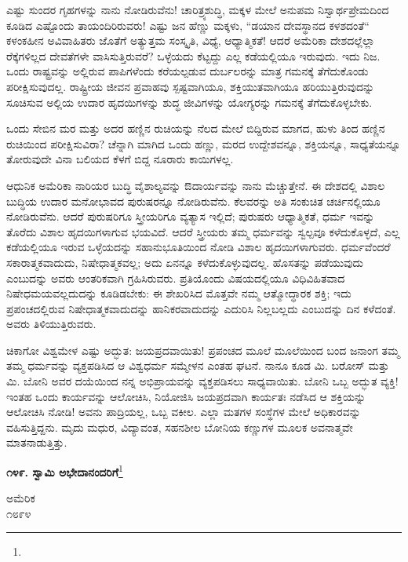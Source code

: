 ಎಷ್ಟು ಸುಂದರ ಗೃಹಗಳನ್ನು ನಾನು ನೋಡಿರುವೆನು! ಚಾರಿತ್ರ್ಯಶುದ್ಧಿ, ಮಕ್ಕಳ ಮೇಲೆ ಅನುಪಮ ನಿಸ್ವಾರ್ಥಪ್ರೇಮದಿಂದ ಕೂಡಿದ ಎಷ್ಟೊಂದು ತಾಯಂದಿರಿರುವರು! ಎಷ್ಟು ಜನ ಹೆಣ್ಣು ಮಕ್ಕಳು, “ಡಯಾನ ದೇವಸ್ಥಾನದ ಕಳಶದಂತೆ“ ಕಳಂಕಹೀನ ಅವಿವಾಹಿತರು\enginline{-} ಜೊತೆಗೆ ಅತ್ಯುತ್ತಮ ಸಂಸ್ಕೃತಿ, ವಿಧ್ಯೆ, ಆಧ್ಯಾತ್ಮಿಕತೆ! ಆದರೆ ಅಮೆರಿಕಾ ದೇಶದಲ್ಲೆಲ್ಲಾ ರೆಕ್ಕೆಗಳಿಲ್ಲದ ದೇವತೆಗಳೇ ವಾಸಿಸುತ್ತಿರುವರೆ? ಒಳ್ಳೆಯದು ಕೆಟ್ಟದ್ದು ಎಲ್ಲ ಕಡೆಯಲ್ಲಿಯೂ ಇರುವುದು. ಇದು ನಿಜ. ಒಂದು ರಾಷ್ಟ್ರವನ್ನು ಅಲ್ಲಿರುವ ಪಾಪಿಗಳೆಂದು ಕರೆಯಲ್ಪಡುವ ದುರ್ಬಲರನ್ನು ಮಾತ್ರ ಗಮನಕ್ಕೆ ತೆಗೆದುಕೊಂಡು ಪರೀಕ್ಷಿಸುವುದಲ್ಲ. ರಾಷ್ಟ್ರೀಯ ಜೀವನ ಪ್ರವಾಹವು ಸ್ಪಷ್ಟವಾಗಿಯೂ, ಶಕ್ತಿಯುತವಾಗಿಯೂ ಹರಿಯುತ್ತಿರುವುದನ್ನು ಸೂಚಿಸುವ ಅಲ್ಲಿಯ ಉದಾರ ಹೃದಯಿಗಳನ್ನು ಶುದ್ಧ ಜೀವಿಗಳನ್ನು ಯೋಗ್ಯರನ್ನು ಗಮನಕ್ಕೆ ತೆಗೆದುಕೊಳ್ಳಬೇಕು.

ಒಂದು ಸೇಬಿನ ಮರ ಮತ್ತು ಅದರ ಹಣ್ಣಿನ ರುಚಿಯನ್ನು ನೆಲದ ಮೇಲೆ ಬಿದ್ದಿರುವ ಮಾಗದ, ಹುಳು ತಿಂದ ಹಣ್ಣಿನ ರುಚಿಯಿಂದ ಪರೀಕ್ಷಿಸುವಿರಾ? ಚೆನ್ನಾಗಿ ಮಾಗಿದ ಒಂದು ಹಣ್ಣು, ಮರದ ಉದ್ದೇಶವನ್ನೂ, ಶಕ್ತಿಯನ್ನೂ, ಸಾಧ್ಯತೆಯನ್ನೂ ತೋರುವುದೇ ವಿನಾ ಬಲಿಯದ ಕೆಳಗೆ ಬಿದ್ದ ನೂರಾರು ಕಾಯಿಗಳಲ್ಲ.

ಆಧುನಿಕ ಅಮೆರಿಕಾ ನಾರಿಯರ ಬುದ್ಧಿ ವೈಶಾಲ್ಯವನ್ನು ಔದಾರ್ಯವನ್ನು ನಾನು ಮೆಚ್ಚುತ್ತೇನೆ. ಈ ದೇಶದಲ್ಲಿ ವಿಶಾಲ ಬುದ್ಧಿಯ ಉದಾರ ಮನೋಭಾವದ ಪುರುಷರನ್ನೂ ನೋಡಿರುವೆನು. ಕೆಲವರನ್ನು ಅತಿ ಸಂಕುಚಿತ ಚರ್ಚಿನಲ್ಲಿಯೂ ನೋಡಿರುವೆನು. ಆದರೆ ಪುರುಷರಿಗೂ ಸ್ತ್ರೀಯರಿಗೂ ವ್ಯತ್ಯಾಸ ಇಲ್ಲಿದೆ; ಪುರುಷರು ಆಧ್ಯಾತ್ಮಿಕತೆ, ಧರ್ಮ ಇವನ್ನು ತೊರೆದು ವಿಶಾಲ ಹೃದಯಿಗಳಾಗುವ ಭಯವಿದೆ. ಆದರೆ ಸ್ತ್ರೀಯರು ತಮ್ಮ ಧರ್ಮವನ್ನು ಸ್ವಲ್ಪವೂ ಕಳೆದುಕೊಳ್ಳದೆ, ಎಲ್ಲ ಕಡೆಯಲ್ಲಿಯೂ ಇರುವ ಒಳ್ಳೆಯದನ್ನು ಸಹಾನುಭೂತಿಯಿಂದ ನೋಡಿ ವಿಶಾಲ ಹೃದಯಿಗಳಾಗುವರು. ಧರ್ಮವೆಂದರೆ ಸಕಾರಾತ್ಮಕವಾದುದು, ನಿಷೇಧಾತ್ಮಕವಲ್ಲ; ಅದು ಏನನ್ನೂ ಕಳೆದುಕೊಳ್ಳುವುದಲ್ಲ. ಹೊಸತನ್ನು ಪಡೆಯುವುದು ಎಂಬುದನ್ನು ಅವರು ಆಂತರಿಕವಾಗಿ ಗ್ರಹಿಸಿರುವರು. ಪ್ರತಿಯೊಂದು ವಿಷಯದಲ್ಲಿಯೂ ವಿಧಿವಿಹಿತವಾದ ನಿಷೇಧಮಯವಲ್ಲದುದನ್ನು ಕೂಡಿಡಬೇಕು: ಈ ಶೇಖರಿಸಿದ ಮೊತ್ತವೇ ನಮ್ಮ ಆತ್ಮೋದ್ಧಾರಕ ಶಕ್ತಿ; ಇದು ಪ್ರಪಂಚದಲ್ಲಿರುವ ನಿಷೇಧಾತ್ಮಕವಾದುದನ್ನು ಹಾನಿಕರವಾದುದನ್ನು ಎದುರಿಸಿ ನಿಲ್ಲಬಲ್ಲದು ಎಂಬುದನ್ನು ದಿನ ಕಳೆದಂತೆ. ಅವರು ತಿಳಿಯುತ್ತಿರುವರು.

ಚಿಕಾಗೋ ವಿಶ್ವಮೇಳ ಎಷ್ಟು ಅದ್ಭುತ: ಜಯಪ್ರದವಾಯಿತು! ಪ್ರಪಂಚದ ಮೂಲೆ ಮೂಲೆಯಿಂದ ಬಂದ ಜನಾಂಗ ತಮ್ಮ ತಮ್ಮ ಧರ್ಮವನ್ನು ವ್ಯಕ್ತಪಡಿಸಿದ ಆ ವಿಶ್ವಧರ್ಮ ಸಮ್ಮೇಳನ ಎಂತಹ ಘಟನೆ. ನಾನೂ ಕೂಡ ಮಿ. ಬರೋಸ್ ಮತ್ತು ಮಿ. ಬೋನಿ ಅವರ ದಯೆಯಿಂದ ನನ್ನ ಅಭಿಪ್ರಾಯವನ್ನು ವ್ಯಕ್ತಪಡಿಸಲು ಸಾಧ್ಯವಾಯಿತು. ಬೋನಿ ಒಬ್ಬ ಅದ್ಭುತ ವ್ಯಕ್ತಿ! ಇಂತಹ ಒಂದು ಕಾರ್ಯವನ್ನು ಆಲೋಚಿಸಿ, ನಿಯೋಜಿಸಿ ಜಯಪ್ರದವಾಗಿ ಕಾರ್ಯತಃ ನಡೆಸಿದ ಆ ಶಕ್ತಿಯನ್ನು ಆಲೋಚಿಸಿ ನೋಡಿ! ಅವನು ಪಾದ್ರಿಯಲ್ಲ, ಒಬ್ಬ ವಕೀಲ. ಎಲ್ಲಾ ಮತಗಳ ಸಂಸ್ಥೆಗಳ ಮೇಲೆ ಅಧಿಕಾರವನ್ನು ವಹಿಸುತ್ತಿದ್ದನು. ಮೃದು ಮಧುರ, ವಿದ್ಯಾವಂತ, ಸಹನಶೀಲ ಬೋನಿಯ ಕಣ್ಣುಗಳ ಮೂಲಕ ಅವನಾತ್ಮವೇ ಮಾತನಾಡುತ್ತಿತ್ತು.

\begin{center}
\textbf{೧೪೯. ಸ್ವಾಮಿ ಅಭೇದಾನಂದರಿಗೆ}\footnote{}
\end{center}

\begin{flushright}
ಅಮೆರಿಕ\\೧೮೯೪
\end{flushright}


